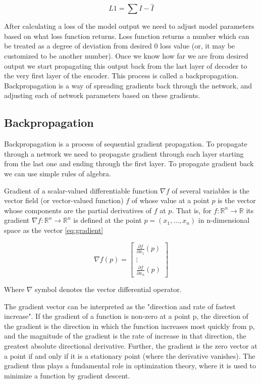 \begin{equation}
    \label{eq:l1}
    L1=\sum{I-\hat{I}}
\end{equation}

After calculating a loss of the model output we need to adjust model parameters based on what loss function returns. Loss function returns a number which can be treated as a degree of deviation from desired $0$ loss value (or, it may be customized to be another number). Once we know how far we are from desired output we start propagating this output back from the last layer of decoder to the very first layer of the encoder. This process is called a backpropagation. Backpropagation is a way of spreading gradients back through the network, and adjusting each of network parameters based on these gradients.

\subsection{Backpropagation}

Backpropagation is a process of sequential gradient propagation. To propagate through a network we need to propagate gradient through each layer starting from the last one and ending through the first layer. To propagate gradient back we can use simple rules of algebra.

Gradient of a scalar-valued differentiable function $\nabla f$ of several variables is the vector field (or vector-valued function) $f$ of whose value at a point $p$ is the vector whose components are the partial derivatives of $f$ at $p$. That is, for $f\colon \mathbb {R} ^{n}\to \mathbb {R}$ its gradient $\nabla f\colon \mathbb {R} ^{n}\to \mathbb {R} ^{n}$ is defined at the point $p=(x_{1},\ldots ,x_{n})$ in n-dimensional space as the vector \ref{eq:gradient}

\begin{equation}
    \label{eq:gradient}
    \nabla f(p)=
    \begin{bmatrix}{
        \frac {\partial f}{\partial x_{1}}}(p) \\\vdots \\{\frac {\partial f}{\partial x_{n}}}(p)
    \end{bmatrix}
\end{equation}

Where $\nabla$ symbol denotes the vector differential operator.

The gradient vector can be interpreted as the "direction and rate of fastest increase". If the gradient of a function is non-zero at a point p, the direction of the gradient is the direction in which the function increases most quickly from p, and the magnitude of the gradient is the rate of increase in that direction, the greatest absolute directional derivative. Further, the gradient is the zero vector at a point if and only if it is a stationary point (where the derivative vanishes). The gradient thus plays a fundamental role in optimization theory, where it is used to minimize a function by gradient descent.


